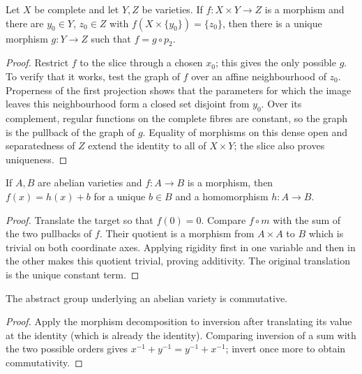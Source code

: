 \begin{lemma}
\label{mumford-lem-rigidity-form-I}
Let $X$ be complete and let $Y,Z$ be varieties.  If
$f:X\times Y\to Z$ is a morphism and there are $y_0\in Y$, $z_0\in Z$ with
$f(X\times\{y_0\})=\{z_0\}$, then there is a unique morphism $g:Y\to Z$ such
that $f=g\circ p_2$.
\begin{proof}
Restrict $f$ to the slice through a chosen $x_0$; this gives the only possible
$g$.  To verify that it works, test the graph of $f$ over an affine
neighbourhood of $z_0$.  Properness of the first projection shows that the
parameters for which the image leaves this neighbourhood form a closed set
disjoint from $y_0$.  Over its complement, regular functions on the complete
fibres are constant, so the graph is the pullback of the graph of $g$.
Equality of morphisms on this dense open and separatedness of $Z$ extend the
identity to all of $X\times Y$; the slice also proves uniqueness.
\end{proof}
\notready
\end{lemma}

\begin{corollary}
\label{mumford-cor-morphism-translation}
If $A,B$ are abelian varieties and $f:A\to B$ is a morphism, then
$f(x)=h(x)+b$ for a unique $b\in B$ and a homomorphism $h:A\to B$.
\begin{proof}
Translate the target so that $f(0)=0$.  Compare $f\circ m$ with the sum of
the two pullbacks of $f$.  Their quotient is a morphism from $A\times A$ to
$B$ which is trivial on both coordinate axes.  Applying rigidity first in one
variable and then in the other makes this quotient trivial, proving additivity.
The original translation is the unique constant term.
\end{proof}
\notready
\end{corollary}

\begin{corollary}[Commutativity]
\label{mumford-cor-abelian-commutative}
The abstract group underlying an abelian variety is commutative.
\begin{proof}
Apply the morphism decomposition to inversion after translating its value at
the identity (which is already the identity).  Comparing inversion of a sum
with the two possible orders gives $x^{-1}+y^{-1}=y^{-1}+x^{-1}$; invert once
more to obtain commutativity.
\end{proof}
\notready
\end{corollary}

